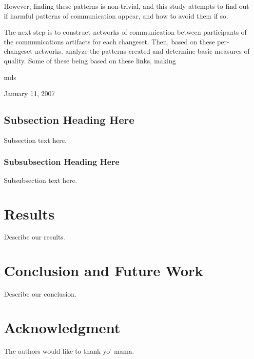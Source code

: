 \documentclass[conference]{IEEEtran}
\begin{document}
However, finding these patterns is non-trivial, and this study attempts to find out if harmful patterns of communication appear, and how to avoid them if so.



The next step is to construct networks of communication between participants of the communications artifacts for each changeset.  Then, based on these per-changeset networks, analyze the patterns created and determine basic measures of quality.  Some of these being based on these links, making  

\hfill mds
 
\hfill January 11, 2007

\subsection{Subsection Heading Here}
Subsection text here.

\subsubsection{Subsubsection Heading Here}
Subsubsection text here.


\section{Results}
Describe our results.


\section{Conclusion and Future Work}
Describe our conclusion.


\section*{Acknowledgment}
The authors would like to thank yo' mama.





\end{document}
